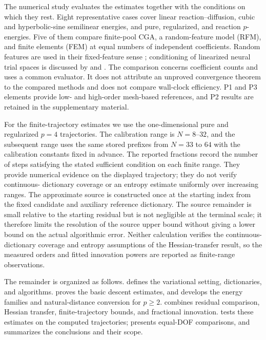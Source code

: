 The numerical study evaluates the estimates together with the conditions on which they rest. Eight
representative cases cover linear reaction--diffusion, cubic and hyperbolic-sine semilinear
energies, and pure, regularized, and reaction \(p\)-energies. Five of them compare finite-pool CGA, a
random-feature model (RFM), and finite elements (FEM) at equal numbers of independent coefficients.
Random features are used in their fixed-feature sense \citep{RahimiRecht2007}; conditioning of
linearized neural trial spaces is discussed by \citet{ChenChiEYang2022} and
\citet{MaoXuXu2026}. The comparison concerns coefficient counts and uses a common evaluator. It does
not attribute an unproved convergence theorem to the compared methods and does not compare
wall-clock efficiency. P1 and P3 elements provide low- and high-order mesh-based references, and P2
results are retained in the supplementary material.

For the finite-trajectory estimates we use the one-dimensional pure and regularized $p=4$
trajectories. The calibration range is $N=8$--$32$, and the subsequent range uses the same stored
prefixes from $N=33$ to $64$ with the calibration constants fixed in advance. The reported
fractions record the number of steps satisfying the stated sufficient condition on each finite
range. They provide numerical evidence on the displayed trajectory; they do not verify continuous-
dictionary coverage or an entropy estimate uniformly over increasing ranges. The approximate
source is constructed once at the starting index from the fixed candidate and auxiliary reference
dictionary. The source remainder is small relative to the starting residual but is not negligible
at the terminal scale; it therefore limits the resolution of the source upper bound without giving
a lower bound on the actual algorithmic error. Neither calculation verifies the continuous-
dictionary coverage and entropy assumptions of the Hessian-transfer result, so the measured orders
and fitted innovation powers are reported as finite-range observations.

The remainder is organized as follows.  defines the variational setting,
dictionaries, and algorithms.  proves the basic descent estimates, and
 develops the energy families and natural-distance conversion for \(p\geq2\).
 combines residual comparison, Hessian transfer, finite-trajectory
bounds, and fractional innovation.  tests these estimates on the computed
trajectories;  presents equal-DOF comparisons, and 
summarizes the conclusions and their scope.
